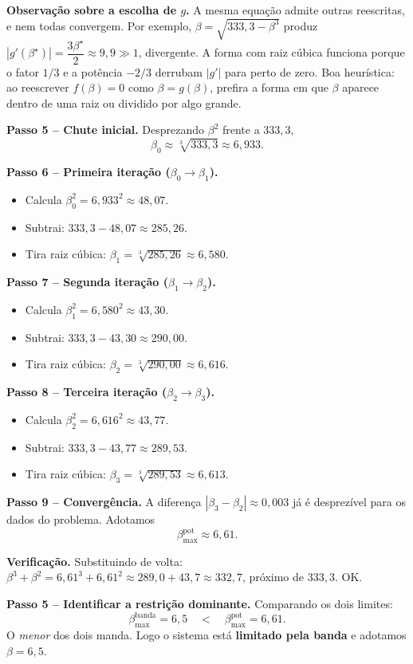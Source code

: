 \documentclass[11pt,a4paper]{article}
\begin{document}
\begin{resolucao}
\textbf{Observação sobre a escolha de $g$.} A mesma equação admite outras reescritas, e nem todas convergem. Por exemplo, $\beta = \sqrt{333{,}3 - \beta^3}$ produz $|g'(\beta^\star)| = \dfrac{3\beta^\star}{2} \approx 9{,}9 \gg 1$, divergente. A forma com raiz cúbica funciona porque o fator $1/3$ e a potência $-2/3$ derrubam $|g'|$ para perto de zero. Boa heurística: ao reescrever $f(\beta)=0$ como $\beta=g(\beta)$, prefira a forma em que $\beta$ aparece dentro de uma raiz ou dividido por algo grande.

\textbf{Passo 5 -- Chute inicial.} Desprezando $\beta^2$ frente a $333{,}3$,
\[
  \beta_0 \approx \sqrt[3]{333{,}3} \approx 6{,}933.
\]

\textbf{Passo 6 -- Primeira iteração ($\beta_0 \to \beta_1$).}
\begin{itemize}\itemsep0pt
  \item Calcula $\beta_0^2 = 6{,}933^2 \approx 48{,}07$.
  \item Subtrai: $333{,}3 - 48{,}07 \approx 285{,}26$.
  \item Tira raiz cúbica: $\beta_1 = \sqrt[3]{285{,}26} \approx 6{,}580$.
\end{itemize}

\textbf{Passo 7 -- Segunda iteração ($\beta_1 \to \beta_2$).}
\begin{itemize}\itemsep0pt
  \item Calcula $\beta_1^2 = 6{,}580^2 \approx 43{,}30$.
  \item Subtrai: $333{,}3 - 43{,}30 \approx 290{,}00$.
  \item Tira raiz cúbica: $\beta_2 = \sqrt[3]{290{,}00} \approx 6{,}616$.
\end{itemize}

\textbf{Passo 8 -- Terceira iteração ($\beta_2 \to \beta_3$).}
\begin{itemize}\itemsep0pt
  \item Calcula $\beta_2^2 = 6{,}616^2 \approx 43{,}77$.
  \item Subtrai: $333{,}3 - 43{,}77 \approx 289{,}53$.
  \item Tira raiz cúbica: $\beta_3 = \sqrt[3]{289{,}53} \approx 6{,}613$.
\end{itemize}

\textbf{Passo 9 -- Convergência.} A diferença $|\beta_3 - \beta_2| \approx 0{,}003$ já é desprezível para os dados do problema. Adotamos
\[
  \boxed{\beta_{\max}^{\text{pot}} \approx 6{,}61.}
\]

\textbf{Verificação.} Substituindo de volta: $\beta^3 + \beta^2 = 6{,}61^3 + 6{,}61^2 \approx 289{,}0 + 43{,}7 \approx 332{,}7$, próximo de $333{,}3$. OK.

\textbf{Passo 5 -- Identificar a restrição dominante.} Comparando os dois limites:
\[
  \beta_{\max}^{\text{banda}} = 6{,}5 \quad < \quad \beta_{\max}^{\text{pot}} = 6{,}61.
\]
O \emph{menor} dos dois manda. Logo o sistema está \textbf{limitado pela banda} e adotamos $\beta = 6{,}5$.
\end{resolucao}
\end{document}
